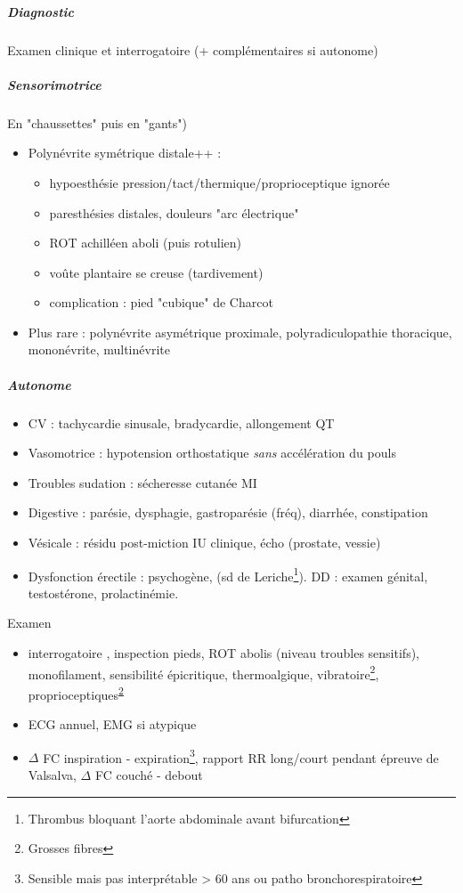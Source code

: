\documentclass[11pt]{article}
\begin{document}
\subparagraph{Diagnostic}
\label{sec:org7f7f730}
Examen clinique et interrogatoire (+ complémentaires si autonome)

\subparagraph{Sensorimotrice}
\label{sec:org0d9db9b}
En "chaussettes" puis en "gants")
\begin{itemize}
\item Polynévrite symétrique distale++ :
\begin{itemize}
\item hypoesthésie pression/tact/thermique/proprioceptique ignorée
\item \textpm{} paresthésies distales, douleurs "arc électrique"
\item ROT achilléen aboli (puis rotulien)
\item voûte plantaire se creuse (tardivement)
\item complication : pied "cubique" de Charcot
\end{itemize}
\item Plus rare : polynévrite asymétrique proximale, polyradiculopathie
thoracique, mononévrite, multinévrite
\end{itemize}

\subparagraph{Autonome}
\label{sec:org8b5d3fb}
\begin{itemize}
\item CV : tachycardie sinusale, bradycardie, allongement QT
\item Vasomotrice : hypotension orthostatique \emph{sans} accélération du pouls
\item Troubles sudation : sécheresse cutanée MI
\item Digestive : parésie, dysphagie, gastroparésie (fréq), diarrhée, constipation
\item Vésicale : résidu post-miction \thus IU \thus clinique, écho (prostate, vessie)
\item Dysfonction érectile : psychogène, (sd de Leriche\footnote{Thrombus bloquant l'aorte abdominale avant bifurcation}). DD : examen génital, testostérone, prolactinémie.
\end{itemize}

Examen 
\begin{itemize}
\item interrogatoire , inspection pieds, ROT abolis (niveau troubles sensitifs), monofilament, sensibilité épicritique, thermoalgique, vibratoire\footnote{Grosses fibres\label{org3b44ad5}}, proprioceptiques\textsuperscript{\ref{org3b44ad5}}
\item ECG annuel, EMG si atypique
\item \(\Delta\) FC inspiration - expiration\footnote{Sensible mais pas interprétable > 60 ans ou patho bronchorespiratoire}, rapport RR long/court pendant épreuve de
Valsalva, \(\Delta\) FC couché - debout
\end{itemize}
\end{document}
